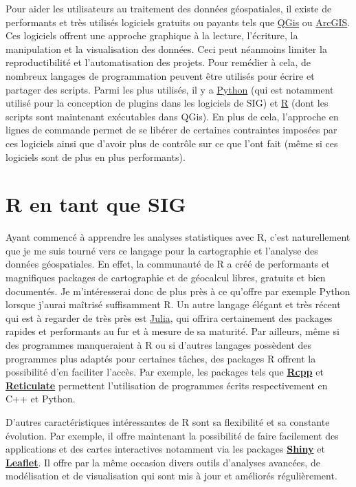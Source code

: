 \documentclass[
]{book}
\begin{document}
Pour aider les utilisateurs au traitement des données géospatiales, il existe de
performants et très utilisés logiciels gratuits ou payants tels que
\href{https://www.qgis.org/fr/site/}{QGis} ou
\href{https://www.arcgis.com/index.html}{ArcGIS}. Ces logiciels offrent une approche
graphique à la lecture, l'écriture, la manipulation et la visualisation des
données. Ceci peut néanmoins limiter la reproductibilité et l'automatisation des
projets. Pour remédier à cela, de nombreux langages de programmation peuvent
être utilisés pour écrire et partager des scripts. Parmi les plus utilisés, il y
a \href{https://www.python.org/}{Python} (qui est notamment utilisé pour la
conception de plugins dans les logiciels de SIG) et
\href{https://www.r-project.org/about.html}{R} (dont les scripts sont maintenant
exécutables dans QGis). En plus de cela, l'approche en lignes de commande permet
de se libérer de certaines contraintes imposées par ces logiciels ainsi que
d'avoir plus de contrôle sur ce que l'ont fait (même si ces logiciels sont de
plus en plus performants).

\hypertarget{r-en-tant-que-sig}{%
\section{R en tant que SIG}\label{r-en-tant-que-sig}}

Ayant commencé à apprendre les analyses statistiques avec R, c'est naturellement
que je me suis tourné vers ce langage pour la cartographie et l'analyse des
données géospatiales. En effet, la communauté de R a créé de performants et
magnifiques packages de cartographie et de géocalcul libres, gratuits et bien
documentés. Je m'intéresserai donc de plus près à ce qu'offre par exemple Python
lorsque j'aurai maîtrisé suffisamment R. Un autre langage élégant et très récent
qui est à regarder de très près est \href{https://julialang.org/}{Julia}, qui offrira
certainement des packages rapides et performants au fur et à mesure de sa
maturité. Par ailleurs, même si des programmes manqueraient à R ou si d'autres
langages possèdent des programmes plus adaptés pour certaines tâches, des
packages R offrent la possibilité d'en faciliter l'accès. Par exemple, les
packages tels que \href{https://github.com/RcppCore/Rcpp}{\textbf{Rcpp}} et
\href{https://rstudio.github.io/reticulate/}{\textbf{Reticulate}} permettent l'utilisation
de programmes écrits respectivement en C++ et Python.

D'autres caractéristiques intéressantes de R sont sa flexibilité et sa constante
évolution. Par exemple, il offre maintenant la possibilité de faire facilement
des applications et des cartes interactives notamment via les packages
\href{https://shiny.rstudio.com/}{\textbf{Shiny}} et
\href{https://rstudio.github.io/leaflet/}{\textbf{Leaflet}}. Il offre par la même occasion
divers outils d'analyses avancées, de modélisation et de visualisation qui sont
mis à jour et améliorés régulièrement.
\end{document}
